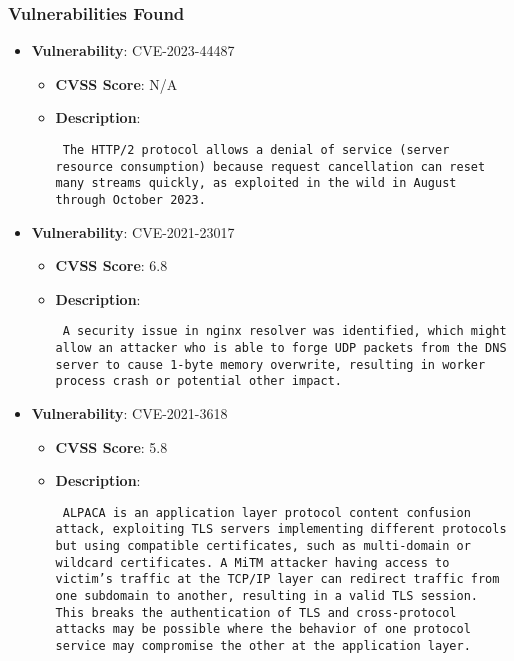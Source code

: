 \documentclass{article}
\begin{document}
\subsubsection*{Vulnerabilities Found}

\begin{itemize}
    
        \item \textbf{Vulnerability}: CVE-2023-44487
        \begin{itemize}
            \item \textbf{CVSS Score}:  N/A 
            \item \textbf{Description}: \parbox{\linewidth}{\texttt{ The HTTP/2 protocol allows a denial of service (server resource consumption) because request cancellation can reset many streams quickly, as exploited in the wild in August through October 2023. }}
        \end{itemize}
    
        \item \textbf{Vulnerability}: CVE-2021-23017
        \begin{itemize}
            \item \textbf{CVSS Score}:  6.8 
            \item \textbf{Description}: \parbox{\linewidth}{\texttt{ A security issue in nginx resolver was identified, which might allow an attacker who is able to forge UDP packets from the DNS server to cause 1-byte memory overwrite, resulting in worker process crash or potential other impact. }}
        \end{itemize}
    
        \item \textbf{Vulnerability}: CVE-2021-3618
        \begin{itemize}
            \item \textbf{CVSS Score}:  5.8 
            \item \textbf{Description}: \parbox{\linewidth}{\texttt{ ALPACA is an application layer protocol content confusion attack, exploiting TLS servers implementing different protocols but using compatible certificates, such as multi-domain or wildcard certificates. A MiTM attacker having access to victim's traffic at the TCP/IP layer can redirect traffic from one subdomain to another, resulting in a valid TLS session. This breaks the authentication of TLS and cross-protocol attacks may be possible where the behavior of one protocol service may compromise the other at the application layer. }}
        \end{itemize}
    

\end{itemize}
\end{document}
